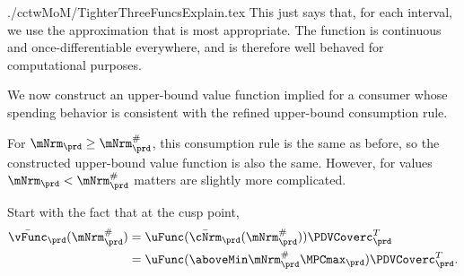 \documentclass[\econtexRoot/SolvingMicroDSOPs]{subfiles}
\begin{document}
\begin{verbatimwrite}{./cctwMoM/TighterThreeFuncsExplain.tex}
  This just says that, for each interval, we use the approximation that
  is most appropriate.  The function is continuous and
  once-differentiable everywhere, and is therefore well behaved for
  computational purposes.
  \begin{comment}
    In practice, in our problem the difference due to this refinement is displayed in Figure \ref{fig:IntExpFOCInvPesReaOpt45GapPlot}.
    \hypertarget{IntExpFOCInvPesReaOpt45GapPlot}{}
    \begin{figure}
      \texttt{[image: ./Figures/IntExpFOCInvPesReaOpt45GapPlot]}
      \caption{Difference Between $\Aprx{\Hi{\cFunc}}_{L, T-1}$ and $\Aprx{\Hi{\cFunc}}_{H,T-1}$ is Small}
      \label{fig:IntExpFOCInvPesReaOpt45GapPlot}
    \end{figure}
  \end{comment}

  We now construct an upper-bound value function implied for a consumer whose spending behavior is consistent with the refined upper-bound consumption rule.

  For $\mNrm_{\prd} \geq \mNrm_{\prd}^{\#}$, this consumption rule is the same as before,
  so the constructed upper-bound value function is also the same.  However, for
  values $\mNrm_{\prd} < \mNrm_{\prd}^{\#}$ matters are slightly more complicated.

  Start with the fact that at the cusp point,
  \begin{equation*}\begin{gathered}\begin{aligned}
        \bar{\vFunc}_{\prd}(\mtCusp)  & = \uFunc(\bar{\cNrm}_{\prd}(\mtCusp))\PDVCoverc_{\prd}^T \\
        & =  \uFunc(\aboveMin \mtCusp  \MPCmax_{\prd})\PDVCoverc_{\prd}^{T}
        .
      \end{aligned}\end{gathered}\end{equation*}


\end{verbatimwrite}
\end{document}
